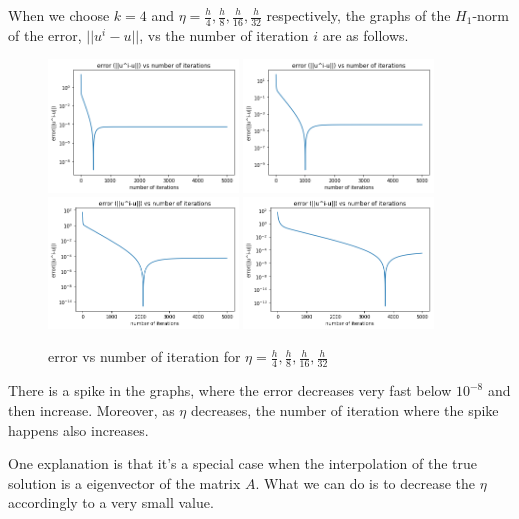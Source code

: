 When we choose $k=4$ and $ \eta=\frac{h}{4},\frac{h}{8},\frac{h}{16},\frac{h}{32}$ respectively, the graphs of the $H_1$-norm of the error, $||u^i-u||$, vs the number of iteration $i$ are as follows.
\begin{figure}[!htbp]
	\begin{center}
		\includegraphics[width=0.45\textwidth]{./figures/h-4}  \quad 
		\includegraphics[width=0.45\textwidth]{./figures/h-8} \\ 
		\includegraphics[width=0.45\textwidth]{./figures/h-16} \quad 
		\includegraphics[width=0.45\textwidth]{./figures/h-32} 
	\end{center}
	\caption{error vs number of iteration for $\eta=\frac{h}{4},\frac{h}{8},\frac{h}{16},\frac{h}{32}$}
\end{figure}

There is a spike in  the graphs, where the error decreases very fast below $10^{-8}$ and then increase. Moreover, as $ \eta$ decreases, the number of iteration where the spike happens also increases. 

One explanation is that it's a special case when the interpolation of the true solution is a eigenvector of the matrix $A$. What we can do is to decrease the $ \eta$ accordingly to a very small value.